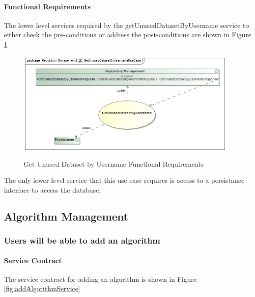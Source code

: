 \paragraph{Functional Requirements}
The lower level services required by the getUnusedDatasetByUsername service to either check the
pre-conditions or address the post-conditions are shown in Figure \ref{fig:getUnusedDatasetByUsernameUseCase}
\begin{figure}[H]
	\begin{center}
		\includegraphics[scale=0.6]{../Diagrams and Charts/Test Data/GetUnusedDatasetByUsernameUseCase.jpg}
		\caption{Get Unused Dataset by Username Functional Requirements}
		\label{fig:getUnusedDatasetByUsernameUseCase}
	\end{center}
\end{figure}

The only lower level service that this use case requires is access to
a persistance interface to access the database.

\subsection{Algorithm Management}
\subsubsection {Users will be able to add an algorithm}
\paragraph{Service Contract}
The service contract for adding an algorithm is shown in Figure \ref{fig:addAlgorithmService}

